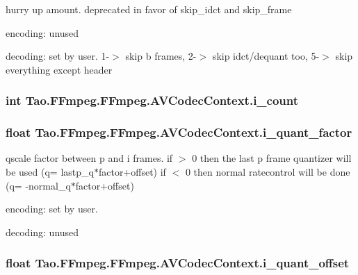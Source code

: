 \label{struct_tao_1_1_f_fmpeg_1_1_f_fmpeg_1_1_a_v_codec_context_af6e3e022f95145f5e5ef763b1390dd5b}
hurry up amount. deprecated in favor of skip\_\-idct and skip\_\-frame
\begin{DoxyItemize}
\item encoding: unused
\item decoding: set by user. 1-\/$>$ skip b frames, 2-\/$>$ skip idct/dequant too, 5-\/$>$ skip everything except header 
\end{DoxyItemize}\hypertarget{struct_tao_1_1_f_fmpeg_1_1_f_fmpeg_1_1_a_v_codec_context_a42d3f1a10492b1e3e3c20659e438e0da}{
\subsubsection[{i\_\-count}]{\setlength{\rightskip}{0pt plus 5cm}int {\bf Tao.FFmpeg.FFmpeg.AVCodecContext.i\_\-count}}}
\label{struct_tao_1_1_f_fmpeg_1_1_f_fmpeg_1_1_a_v_codec_context_a42d3f1a10492b1e3e3c20659e438e0da}
\hypertarget{struct_tao_1_1_f_fmpeg_1_1_f_fmpeg_1_1_a_v_codec_context_a364d0f8292812d2b3a32f7abcb828801}{
\subsubsection[{i\_\-quant\_\-factor}]{\setlength{\rightskip}{0pt plus 5cm}float {\bf Tao.FFmpeg.FFmpeg.AVCodecContext.i\_\-quant\_\-factor}}}
\label{struct_tao_1_1_f_fmpeg_1_1_f_fmpeg_1_1_a_v_codec_context_a364d0f8292812d2b3a32f7abcb828801}
qscale factor between p and i frames. if $>$ 0 then the last p frame quantizer will be used (q= lastp\_\-q$\ast$factor+offset) if $<$ 0 then normal ratecontrol will be done (q= -\/normal\_\-q$\ast$factor+offset)
\begin{DoxyItemize}
\item encoding: set by user.
\item decoding: unused 
\end{DoxyItemize}\hypertarget{struct_tao_1_1_f_fmpeg_1_1_f_fmpeg_1_1_a_v_codec_context_acb11ab2c791025ac9361781957c3bd78}{
\subsubsection[{i\_\-quant\_\-offset}]{\setlength{\rightskip}{0pt plus 5cm}float {\bf Tao.FFmpeg.FFmpeg.AVCodecContext.i\_\-quant\_\-offset}}}
